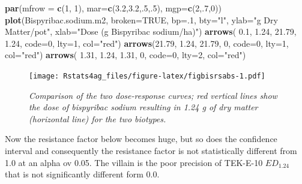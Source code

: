 \documentclass[letterpaper,]{book}
\newenvironment{Shaded}{\begin{snugshade}}{\end{snugshade}}
\newcommand{\DataTypeTok}[1]{\textcolor[rgb]{0.13,0.29,0.53}{#1}}
\newcommand{\DecValTok}[1]{\textcolor[rgb]{0.00,0.00,0.81}{#1}}
\newcommand{\FloatTok}[1]{\textcolor[rgb]{0.00,0.00,0.81}{#1}}
\newcommand{\KeywordTok}[1]{\textcolor[rgb]{0.13,0.29,0.53}{\textbf{#1}}}
\newcommand{\NormalTok}[1]{#1}
\newcommand{\OtherTok}[1]{\textcolor[rgb]{0.56,0.35,0.01}{#1}}
\newcommand{\StringTok}[1]{\textcolor[rgb]{0.31,0.60,0.02}{#1}}
\begin{document}
\begin{Shaded}
\begin{Highlighting}[]
\KeywordTok{par}\NormalTok{(}\DataTypeTok{mfrow =} \KeywordTok{c}\NormalTok{(}\DecValTok{1}\NormalTok{, }\DecValTok{1}\NormalTok{), }\DataTypeTok{mar=}\KeywordTok{c}\NormalTok{(}\FloatTok{3.2}\NormalTok{,}\FloatTok{3.2}\NormalTok{,.}\DecValTok{5}\NormalTok{,.}\DecValTok{5}\NormalTok{), }\DataTypeTok{mgp=}\KeywordTok{c}\NormalTok{(}\DecValTok{2}\NormalTok{,.}\DecValTok{7}\NormalTok{,}\DecValTok{0}\NormalTok{))}
\KeywordTok{plot}\NormalTok{(Bispyribac.sodium.m2, }\DataTypeTok{broken=}\OtherTok{TRUE}\NormalTok{, }\DataTypeTok{bp=}\NormalTok{.}\DecValTok{1}\NormalTok{, }\DataTypeTok{bty=}\StringTok{"l"}\NormalTok{,}
     \DataTypeTok{ylab=}\StringTok{"g Dry Matter/pot"}\NormalTok{,}
     \DataTypeTok{xlab=}\StringTok{"Dose (g Bispyribac sodium/ha)"}\NormalTok{)}
\KeywordTok{arrows}\NormalTok{(  }\FloatTok{0.1}\NormalTok{, }\FloatTok{1.24}\NormalTok{, }\FloatTok{21.79}\NormalTok{, }\FloatTok{1.24}\NormalTok{, }\DataTypeTok{code=}\DecValTok{0}\NormalTok{, }\DataTypeTok{lty=}\DecValTok{1}\NormalTok{, }\DataTypeTok{col=}\StringTok{"red"}\NormalTok{)}
\KeywordTok{arrows}\NormalTok{(}\FloatTok{21.79}\NormalTok{, }\FloatTok{1.24}\NormalTok{, }\FloatTok{21.79}\NormalTok{,    }\DecValTok{0}\NormalTok{, }\DataTypeTok{code=}\DecValTok{0}\NormalTok{, }\DataTypeTok{lty=}\DecValTok{1}\NormalTok{, }\DataTypeTok{col=}\StringTok{"red"}\NormalTok{)}
\KeywordTok{arrows}\NormalTok{(  }\FloatTok{1.31}\NormalTok{, }\FloatTok{1.24}\NormalTok{,   }\FloatTok{1.31}\NormalTok{,    }\DecValTok{0}\NormalTok{, }\DataTypeTok{code=}\DecValTok{0}\NormalTok{, }\DataTypeTok{lty=}\DecValTok{2}\NormalTok{, }\DataTypeTok{col=}\StringTok{"red"}\NormalTok{)}
\end{Highlighting}
\end{Shaded}

\begin{figure}
\centering
\texttt{[image: Rstats4ag\_files/figure-latex/figbisrsabs-1.pdf]}
\caption{\label{fig:figbisrsabs}\emph{Comparison of the two dose-response curves; red vertical lines show the dose of bispyribac sodium resulting in 1.24 g of dry matter (horizontal line) for the two biotypes.}}
\end{figure}

Now the resistance factor below becomes huge, but so does the confidence interval and consequently the resistance factor is not statistically different from 1.0 at an alpha ov 0.05. The villain is the poor precision of TEK-E-10 \(ED_{1.24}\) that is not significantly different form 0.0.
\end{document}
